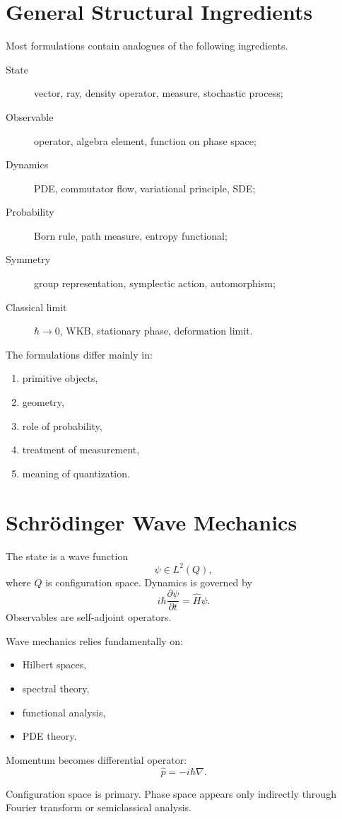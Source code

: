 \section{General Structural Ingredients}
Most formulations contain analogues of the following ingredients.
\begin{description}
    \item [ State] vector, ray, density operator, measure, stochastic process;
    \item [ Observable] operator, algebra element, function on phase space;
    \item [ Dynamics] PDE, commutator flow, variational principle, SDE;
    \item [ Probability] Born rule, path measure, entropy functional;
    \item [ Symmetry] group representation, symplectic action, automorphism;
    \item [ Classical limit] $\hbar\to0$, WKB, stationary phase, deformation limit.
\end{description}
The formulations differ mainly in:
\begin{enumerate}
\item primitive objects,
\item geometry,
\item role of probability,
\item treatment of measurement,
\item meaning of quantization.
\end{enumerate}

\section{Schr\"odinger Wave Mechanics}
\label{qmf:wm}
The state is a wave function
\[\psi \in L^2(Q),\]
where $Q$ is configuration space.
Dynamics is governed by
\[i\hbar \frac{\partial \psi}{\partial t}=\hat H \psi.\]
Observables are self-adjoint operators.

Wave mechanics relies fundamentally on:
\begin{itemize}
\item Hilbert spaces,
\item spectral theory,
\item functional analysis,
\item PDE theory.
\end{itemize}
Momentum becomes differential operator:
\[\hat p = -i\hbar \nabla.\]

Configuration space is primary. Phase space appears only indirectly
through Fourier transform or semiclassical analysis.

